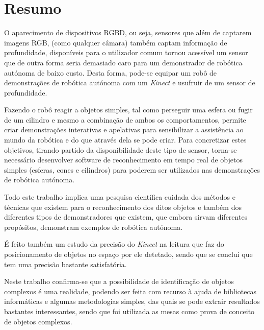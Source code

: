 \chapter{Resumo}

O aparecimento de dispositivos RGBD, ou seja, sensores que além de captarem imagens RGB,
(como qualquer câmara) também captam informação de profundidade, disponíveis para o utilizador
comum tornou acessível um sensor que de outra forma seria demasiado caro
para um demonstrador de robótica autónoma de baixo custo. Desta forma, pode-se equipar um robô de demonstrações de robótica autónoma com um \emph{Kinect} e usufruir de um sensor de profundidade.

Fazendo o robô reagir a objetos simples, tal como perseguir uma esfera ou
fugir de um cilindro e mesmo a combinação de ambos os comportamentos, permite 
criar demonstrações interativas e apelativas para sensibilizar a assistência 
ao mundo da robótica e do que através dela se pode criar. Para concretizar estes objetivos,
tirando partido da disponibilidade deste tipo de sensor, torna-se necessário desenvolver 
software de reconhecimento em tempo real de objetos simples (esferas, cones
e cilindros) para poderem ser utilizados nas demonstrações de robótica
autónoma. 

Todo este trabalho implica uma pesquisa científica cuidada dos métodos e técnicas
que existem para o reconhecimento dos ditos objetos e também dos diferentes tipos
de demonstradores que existem, que embora sirvam diferentes propósitos, demonstram
exemplos de robótica autónoma.

É feito também um estudo da precisão do \emph{Kinect} na leitura que faz do posicionamento de objetos no espaço por ele detetado, sendo que se conclui que tem uma precisão bastante satisfatória.

Neste trabalho confirma-se que a possibilidade de identificação de objetos complexos é uma realidade, podendo ser feita com recurso à ajuda de bibliotecas informáticas e algumas metodologias simples, das quais se pode extrair resultados bastantes interessantes, sendo que foi utilizada as mesas como prova de conceito de objetos complexos.





